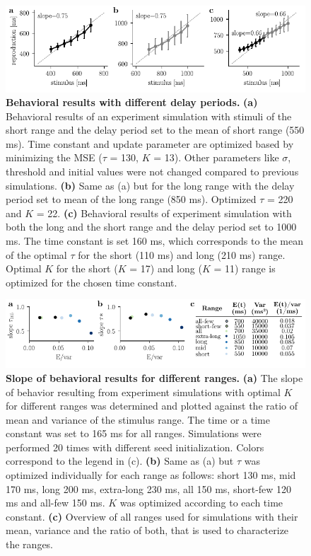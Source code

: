 \documentclass[10pt]{article}
\begin{document}
\begin{figure}[!htb]
	\centering
	\includegraphics{figures/supp_delay.pdf}
	\caption{\textbf{Behavioral results with different delay periods.}
	\textbf{(a)} Behavioral results of an experiment simulation with stimuli of the short range and the delay period set to the mean of short range (550 ms). Time constant and update parameter are optimized based by minimizing the MSE ($\tau$ = 130, $K$ = 13). Other parameters like $\sigma$, threshold and initial values were not changed compared to previous simulations.
	\textbf{(b)} Same as (a) but for the long range with the delay period set to mean of the long range (850 ms). Optimized $\tau$ = 220 and $K$ = 22.
	\textbf{(c)} Behavioral results of experiment simulation with both the long and the short range and the delay period set to 1000 ms. The time constant is set 160 ms, which corresponds to the mean of the optimal $\tau$ for the short (110 ms) and long (210 ms) range. Optimal $K$ for the short ($K$ = 17) and long ($K$ = 11) range is optimized for the chosen time constant. 
	}
\label{sup:delay}
\end{figure}

\begin{figure}[!htb]
	\centering
	\includegraphics{figures/supp_ranges_new.pdf}
	\caption{\textbf{Slope of behavioral results for different ranges.}
	\textbf{(a)} The slope of behavior resulting from experiment simulations with optimal $K$ for different ranges was determined and plotted against the ratio of mean and variance of the stimulus range. The time or a time constant was set to 165 ms for all ranges. Simulations were performed 20 times with different seed initialization. Colors correspond to the legend in (c). 
	\textbf{(b)} Same as (a) but $\tau$ was optimized individually for each range as follows: short 130 ms, mid 170 ms, long 200 ms, extra-long 230 ms, all 150 ms, short-few 120 ms and all-few 150 ms. $K$ was optimized according to each time constant.
	\textbf{(c)} Overview of all ranges used for simulations with their mean, variance and the ratio of both, that is used to characterize the ranges. 
	}
\label{sup:ranges}
\end{figure}
\end{document}
